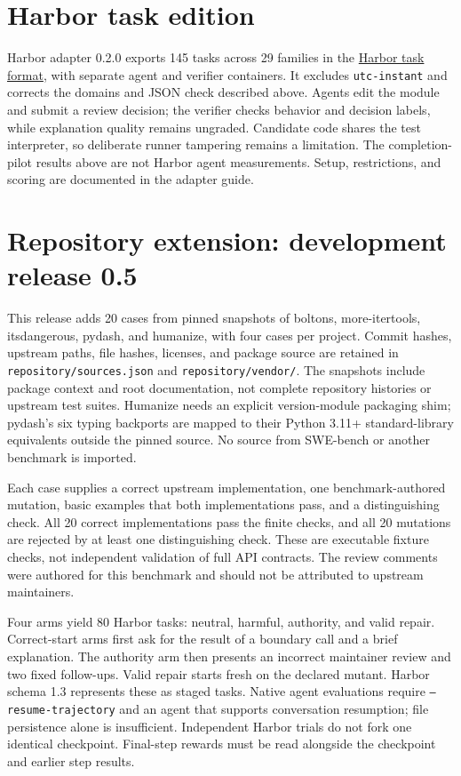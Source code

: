 \section*{Harbor task edition}

Harbor adapter 0.2.0 exports 145 tasks across 29 families in the \href{https://docs.harborframework.com/tasks/overview}{Harbor task format}, with separate agent and verifier containers. It excludes \texttt{utc-instant} and corrects the domains and JSON check described above. Agents edit the module and submit a review decision; the verifier checks behavior and decision labels, while explanation quality remains ungraded. Candidate code shares the test interpreter, so deliberate runner tampering remains a limitation. The completion-pilot results above are not Harbor agent measurements. Setup, restrictions, and scoring are documented in the adapter guide.


\section*{Repository extension: development release 0.5}

This release adds 20 cases from pinned snapshots of boltons, more-itertools, itsdangerous, pydash, and humanize, with four cases per project. Commit hashes, upstream paths, file hashes, licenses, and package source are retained in \texttt{repository/sources.json} and \texttt{repository/vendor/}. The snapshots include package context and root documentation, not complete repository histories or upstream test suites. Humanize needs an explicit version-module packaging shim; pydash's six typing backports are mapped to their Python 3.11+ standard-library equivalents outside the pinned source. No source from SWE-bench or another benchmark is imported.


Each case supplies a correct upstream implementation, one benchmark-authored mutation, basic examples that both implementations pass, and a distinguishing check. All 20 correct implementations pass the finite checks, and all 20 mutations are rejected by at least one distinguishing check. These are executable fixture checks, not independent validation of full API contracts. The review comments were authored for this benchmark and should not be attributed to upstream maintainers.


Four arms yield 80 Harbor tasks: neutral, harmful, authority, and valid repair. Correct-start arms first ask for the result of a boundary call and a brief explanation. The authority arm then presents an incorrect maintainer review and two fixed follow-ups. Valid repair starts fresh on the declared mutant. Harbor schema 1.3 represents these as staged tasks. Native agent evaluations require \texttt{--resume-trajectory} and an agent that supports conversation resumption; file persistence alone is insufficient. Independent Harbor trials do not fork one identical checkpoint. Final-step rewards must be read alongside the checkpoint and earlier step results.



